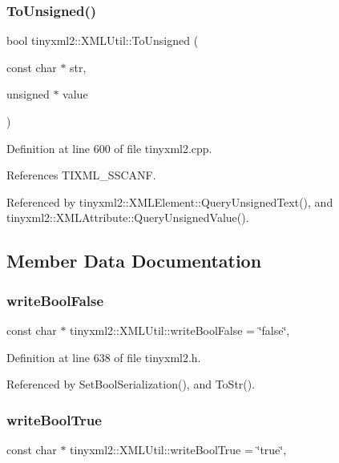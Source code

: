 \subsubsection{ToUnsigned()}
{\footnotesize\ttfamily bool tinyxml2\+::\+X\+M\+L\+Util\+::\+To\+Unsigned (\begin{DoxyParamCaption}\item[{const char $\ast$}]{str,  }\item[{unsigned $\ast$}]{value }\end{DoxyParamCaption})\hspace{0.3cm}{\ttfamily [static]}}



Definition at line 600 of file tinyxml2.\+cpp.



References T\+I\+X\+M\+L\+\_\+\+S\+S\+C\+A\+NF.



Referenced by tinyxml2\+::\+X\+M\+L\+Element\+::\+Query\+Unsigned\+Text(), and tinyxml2\+::\+X\+M\+L\+Attribute\+::\+Query\+Unsigned\+Value().



\subsection{Member Data Documentation}
\mbox{\label{classtinyxml2_1_1_x_m_l_util_ae09aaf302e2ab8c196e14643ef98e3a3}} 
\subsubsection{writeBoolFalse}
{\footnotesize\ttfamily const char $\ast$ tinyxml2\+::\+X\+M\+L\+Util\+::write\+Bool\+False = \char`\"{}false\char`\"{}\hspace{0.3cm}{\ttfamily [static]}, {\ttfamily [private]}}



Definition at line 638 of file tinyxml2.\+h.



Referenced by Set\+Bool\+Serialization(), and To\+Str().

\mbox{\label{classtinyxml2_1_1_x_m_l_util_aafa8c6e965f8f95d5bcd9e7646983470}} 
\subsubsection{writeBoolTrue}
{\footnotesize\ttfamily const char $\ast$ tinyxml2\+::\+X\+M\+L\+Util\+::write\+Bool\+True = \char`\"{}true\char`\"{}\hspace{0.3cm}{\ttfamily [static]}, {\ttfamily [private]}}



